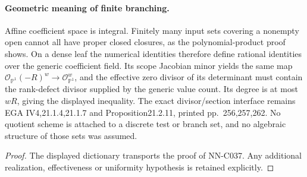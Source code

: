 \begin{geometricstatement}[NN-C037]
\paragraph{Geometric meaning of finite branching.}
Affine coefficient space is integral. Finitely many input
sets covering a nonempty open cannot all have proper
closed closures, as the polynomial-product proof shows.
On a dense leaf the numerical identities therefore define
rational identities over the generic coefficient field.
Its scope Jacobian minor yields the same map
$\mathcal O_{\mathbb P^1}(-R)^w\to\mathcal O_{\mathbb P^1}^w$,
and the effective zero divisor of its determinant must
contain the rank-defect divisor supplied by the generic
value count. Its degree is at most $wR$, giving the displayed
inequality. The exact divisor/section interface remains
EGA IV4,21.1.4,21.1.7 and Proposition21.2.11, printed
pp.~256,257,262. No quotient scheme is attached to a
discrete test or branch set, and no algebraic structure
of those sets was assumed.

\end{geometricstatement}
\begin{proof} The displayed dictionary transports the proof of NN-C037. Any additional realization, effectiveness or uniformity hypothesis is retained explicitly.\end{proof}


